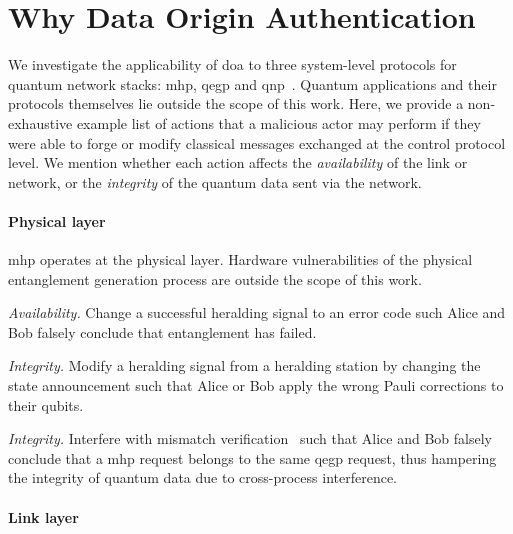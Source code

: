 \section{Why Data Origin Authentication}
\label{sec:doa:why}

We investigate the applicability of \acrlong{doa} to three system-level protocols for quantum
network stacks: \acrshort{mhp}, \acrshort{qegp} and \acrshort{qnp}~\cite{dahlberg_2019_egp,
kozlowski_2020_qnp}. Quantum applications and their protocols themselves lie outside the scope of
this work. Here, we provide a non-exhaustive example list of actions that a malicious actor may
perform if they were able to forge or modify classical messages exchanged at the control protocol
level. We mention whether each action affects the \emph{availability} of the link or network, or the
\emph{integrity} of the quantum data sent via the network.

\paragraph{Physical layer}

\acrshort{mhp} operates at the physical layer. Hardware vulnerabilities of the physical entanglement
generation process are outside the scope of this work.

\begin{example}
\textit{Availability.}
Change a successful heralding signal to an error code such Alice and Bob falsely conclude that
entanglement has failed.
\end{example}

\begin{example}
\textit{Integrity.}
Modify a heralding signal from a heralding station by changing the state announcement such that
Alice or Bob apply the wrong Pauli corrections to their qubits.
\end{example}

\begin{example}
\textit{Integrity.}
Interfere with mismatch verification~\cite{dahlberg_2019_egp, pompili_2022_experimental} such that
Alice and Bob falsely conclude that a \acrshort{mhp} request belongs to the same \acrshort{qegp}
request, thus hampering the integrity of quantum data due to cross-process interference.
\end{example}

\paragraph{Link layer}

